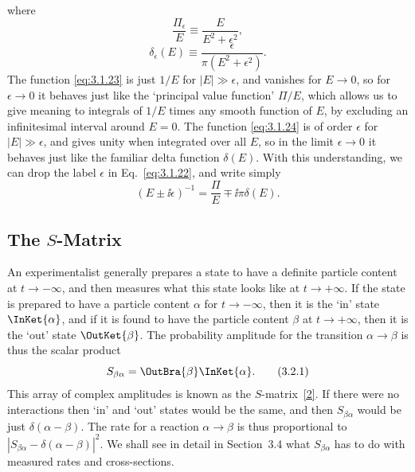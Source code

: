 
where
\begin{equation}
\frac{\Pi_\epsilon}{E}\equiv\frac{E}{E^2+\epsilon^2},
\tag{3.1.23}\label{eq:3.1.23}
\end{equation}
\begin{equation}
\delta_\epsilon(E)\equiv\frac{\epsilon}{\pi(E^2+\epsilon^2)}.
\tag{3.1.24}\label{eq:3.1.24}
\end{equation}
The function \eqref{eq:3.1.23} is just $1/E$ for $|E|\gg\epsilon$, and vanishes for
$E\to0$, so for $\epsilon\to0$ it behaves just like the `principal value
function' $\Pi/E$, which allows us to give meaning to integrals of
$1/E$ times any smooth function of $E$, by excluding an infinitesimal
interval around $E=0$. The function \eqref{eq:3.1.24} is of order $\epsilon$ for
$|E|\gg\epsilon$, and gives unity when integrated over all $E$, so in the
limit $\epsilon\to0$ it behaves just like the familiar delta function
$\delta(E)$. With this understanding, we can drop the label $\epsilon$ in
Eq.~\eqref{eq:3.1.22}, and write simply
\begin{equation}
(E\mathbin{\pm}\ii\epsilon)^{-1}
=\frac{\Pi}{E}\mp \ii\pi\delta(E).
\tag{3.1.25}\label{eq:3.1.25}
\end{equation}

\subsection{\texorpdfstring{The $S$-Matrix}{The S-Matrix}}

An experimentalist generally prepares a state to have a definite particle
content at $t\to-\infty$, and then measures what this state looks like at
$t\to+\infty$. If the state is prepared to have a particle content $\alpha$
for $t\to-\infty$, then it is the `in' state
$\InKet{\alpha}$, and if it is found to have the particle content
$\beta$ at $t\to+\infty$, then it is the `out' state
$\OutKet{\beta}$. The probability amplitude for the transition
$\alpha\to\beta$ is thus the scalar product
\begin{equation}
S_{\beta\alpha}=\OutBra{\beta}\InKet{\alpha}.
\tag{3.2.1}\label{eq:3.2.1}
\end{equation}
This array of complex amplitudes is known as the $S$-matrix~\hyperref[ref:3.2]{[2]}. If there
were no interactions then `in' and `out' states would be the same, and then
$S_{\beta\alpha}$ would be just $\delta(\alpha-\beta)$. The rate for a
reaction $\alpha\to\beta$ is thus proportional to
$|S_{\beta\alpha}-\delta(\alpha-\beta)|^2$. We shall see in detail in
Section~3.4 what $S_{\beta\alpha}$ has to do with measured rates and
cross-sections.


